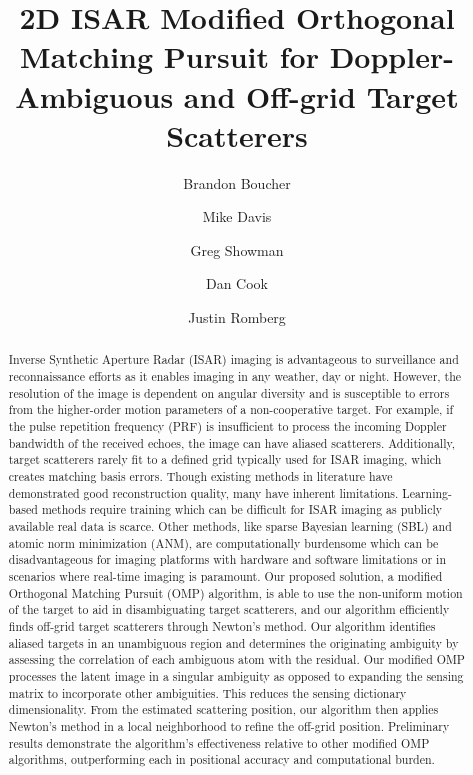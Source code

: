 \documentclass[]{spie}  %
\title{2D ISAR Modified Orthogonal Matching Pursuit for Doppler-Ambiguous and Off-grid Target Scatterers}
\author[a]{Brandon Boucher}
\author[b]{Mike Davis}
\author[b]{Greg Showman}
\author[b]{Dan Cook}
\author[a]{Justin Romberg}
\affil[a]{Georgia Institute of Technology, 225 North Avenue, Atlanta, US}
\affil[b]{Georgia Tech Research Institute, 250 14th Street, Atlanta, US}
\begin{document}
 
\maketitle

\begin{abstract}
Inverse Synthetic Aperture Radar (ISAR) imaging is advantageous to surveillance and reconnaissance efforts as it enables imaging in any weather, day or night. However, the resolution of the image is dependent on angular diversity and is susceptible to errors from the higher-order motion parameters of a non-cooperative target. For example, if the pulse repetition frequency (PRF) is insufficient to process the incoming Doppler bandwidth of the received echoes, the image can have aliased scatterers. Additionally, target scatterers rarely fit to a defined grid typically used for ISAR imaging, which creates matching basis errors. Though existing methods in literature have demonstrated good reconstruction quality, many have inherent limitations. Learning-based methods require training which can be difficult for ISAR imaging as publicly available real data is scarce. Other methods, like sparse Bayesian learning (SBL) and atomic norm minimization (ANM), are computationally burdensome which can be disadvantageous for imaging platforms with hardware and software limitations or in scenarios where real-time imaging is paramount. Our proposed solution, a modified Orthogonal Matching Pursuit (OMP) algorithm, is able to use the non-uniform motion of the target to aid in disambiguating target scatterers, and our algorithm efficiently finds off-grid target scatterers through Newton’s method. Our algorithm identifies aliased targets in an unambiguous region and determines the originating ambiguity by assessing the correlation of each ambiguous atom with the residual. Our modified OMP processes the latent image in a singular ambiguity as opposed to expanding the sensing matrix to incorporate other ambiguities. This reduces the sensing dictionary dimensionality. From the estimated scattering position, our algorithm then applies Newton’s method in a local neighborhood to refine the off-grid position. Preliminary results demonstrate the algorithm’s effectiveness relative to other modified OMP algorithms, outperforming each in positional accuracy and computational burden.
\end{abstract}

\end{document}
